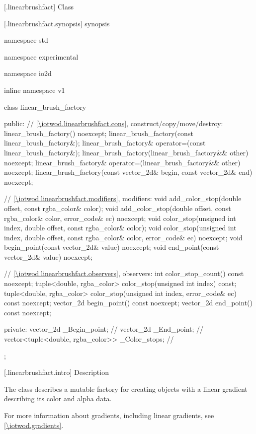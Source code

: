  [\iotwod.linearbrushfact] {Class }

 [\iotwod.linearbrushfact.synopsis] { synopsis}

\begin{codeblock}
namespace std { namespace experimental { namespace io2d { inline namespace v1 {
  class linear_brush_factory {
  public:
    // \ref{\iotwod.linearbrushfact.cons}, construct/copy/move/destroy:
    linear_brush_factory() noexcept;
    linear_brush_factory(const linear_brush_factory&);
    linear_brush_factory& operator=(const linear_brush_factory&);
    linear_brush_factory(linear_brush_factory&& other) noexcept;
    linear_brush_factory& operator=(linear_brush_factory&& other) noexcept;
    linear_brush_factory(const vector_2d& begin, const vector_2d& end) noexcept;

    // \ref{\iotwod.linearbrushfact.modifiers}, modifiers:
    void add_color_stop(double offset, const rgba_color& color);
    void add_color_stop(double offset, const rgba_color& color, 
      error_code& ec) noexcept;
    void color_stop(unsigned int index, double offset,
      const rgba_color& color);
    void color_stop(unsigned int index, double offset,
      const rgba_color& color, error_code& ec) noexcept;
    void begin_point(const vector_2d& value) noexcept;
    void end_point(const vector_2d& value) noexcept;

    // \ref{\iotwod.linearbrushfact.observers}, observers:
    int color_stop_count() const noexcept;
    tuple<double, rgba_color> color_stop(unsigned int index) const;
    tuple<double, rgba_color> color_stop(unsigned int index,
      error_code& ec) const noexcept;
    vector_2d begin_point() const noexcept;
    vector_2d end_point() const noexcept;

  private:
    vector_2d _Begin_point;                             // \expos
    vector_2d _End_point;                               // \expos
    vector<tuple<double, rgba_color>> _Color_stops; // \expos
  };
} } } }
\end{codeblock}

 [\iotwod.linearbrushfact.intro] { Description}

\pnum
{}
The class  describes a mutable factory for creating  objects with a linear gradient describing its color and alpha data.

\pnum
For more information about gradients, including linear gradients, see \ref{\iotwod.gradients}.

